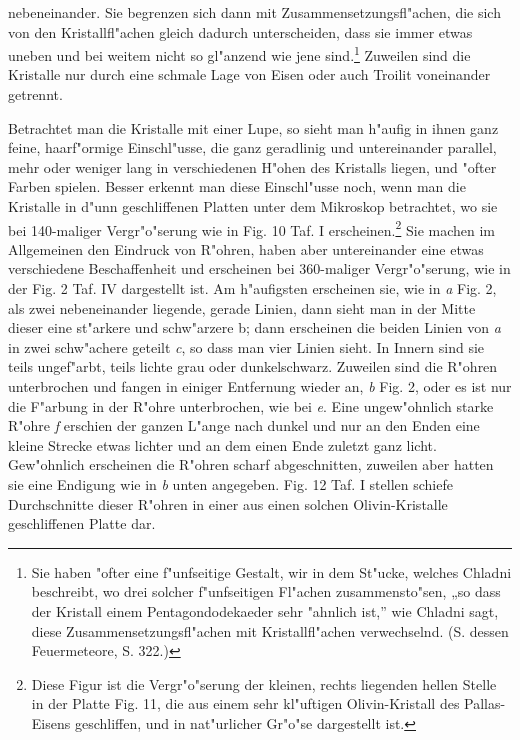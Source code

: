 \documentclass[a4paper, 11pt, oneside, german]{article}
\begin{document}
nebeneinander. Sie begrenzen sich dann mit Zusammensetzungsfl"achen, die sich von den Kristallfl"achen gleich dadurch unterscheiden, dass sie immer etwas uneben und bei weitem nicht so gl"anzend wie jene sind.\footnote{Sie haben "ofter eine f"unfseitige Gestalt, wir in dem St"ucke, welches Chladni beschreibt, wo drei solcher f"unfseitigen Fl"achen zusammensto"sen, „so dass der Kristall einem Pentagondodekaeder sehr "ahnlich ist,” wie Chladni sagt, diese Zusammensetzungsfl"achen mit Kristallfl"achen verwechselnd. (S. dessen Feuermeteore, S. 322.)} Zuweilen sind die Kristalle nur durch eine schmale Lage von Eisen oder auch Troilit voneinander getrennt.

Betrachtet man die Kristalle mit einer Lupe, so sieht man h"aufig in ihnen ganz feine, haarf"ormige Einschl"usse, die ganz geradlinig und untereinander parallel, mehr oder weniger lang in verschiedenen H"ohen des Kristalls liegen, und "ofter Farben spielen. Besser erkennt man diese Einschl"usse noch, wenn man die Kristalle in d"unn geschliffenen Platten unter dem Mikroskop betrachtet, wo sie bei 140-maliger Vergr"o"serung wie in Fig. 10 Taf. I erscheinen.\footnote{Diese Figur ist die Vergr"o"serung der kleinen, rechts liegenden hellen Stelle in der Platte Fig. 11, die aus einem sehr kl"uftigen Olivin-Kristall des Pallas-Eisens geschliffen, und in nat"urlicher Gr"o"se dargestellt ist.} Sie machen im Allgemeinen den Eindruck von R"ohren, haben aber untereinander eine etwas verschiedene Beschaffenheit und erscheinen bei 360-maliger Vergr"o"serung, wie in der Fig. 2 Taf. IV dargestellt ist. Am h"aufigsten erscheinen sie, wie in \emph{a} Fig. 2, als zwei nebeneinander liegende, gerade Linien, dann sieht man in der Mitte dieser eine st"arkere und schw"arzere b; dann erscheinen die beiden Linien von \emph{a} in zwei schw"achere geteilt \emph{c}, so dass man vier Linien sieht. In Innern sind sie teils ungef"arbt, teils lichte grau oder dunkelschwarz. Zuweilen sind die R"ohren unterbrochen und fangen in einiger Entfernung wieder an, \emph{b} Fig. 2, oder es ist nur die F"arbung in der R"ohre unterbrochen, wie bei \emph{e}. Eine ungew"ohnlich starke R"ohre \emph{f} erschien der ganzen L"ange nach dunkel und nur an den Enden eine kleine Strecke etwas lichter und an dem einen Ende zuletzt ganz licht. Gew"ohnlich erscheinen die R"ohren scharf abgeschnitten, zuweilen aber hatten sie eine Endigung wie in \emph{b} unten angegeben. Fig. 12 Taf. I stellen schiefe Durchschnitte dieser R"ohren in einer aus einen solchen Olivin-Kristalle geschliffenen Platte dar.
\end{document}
